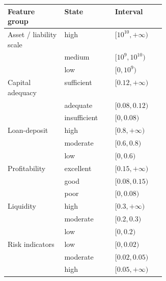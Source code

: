 \documentclass[lettersize,journal]{IEEEtran}
\begin{document}
\noindent\begin{minipage}{\linewidth}
\begin{center}
\label{tab:state-mapping}
\scriptsize
\setlength{\tabcolsep}{3.5pt}
\renewcommand{\arraystretch}{1.08}
\begin{tabular}{@{}>{\RaggedRight\arraybackslash}p{0.36\linewidth} l l@{}}
\hline
\textbf{Feature group} & \textbf{State} & \textbf{Interval} \\
\hline
Asset / liability scale & high & $[10^{10},+\infty)$ \\
 & medium & $[10^{9},10^{10})$ \\
 & low & $[0,10^{9})$ \\[1pt]
Capital adequacy & sufficient & $[0.12,+\infty)$ \\
 & adequate & $[0.08,0.12)$ \\
 & insufficient & $[0,0.08)$ \\[1pt]
Loan-deposit & high & $[0.8,+\infty)$ \\
 & moderate & $[0.6,0.8)$ \\
 & low & $[0,0.6)$ \\[1pt]
Profitability & excellent & $[0.15,+\infty)$ \\
 & good & $[0.08,0.15)$ \\
 & poor & $[0,0.08)$ \\[1pt]
Liquidity & high & $[0.3,+\infty)$ \\
 & moderate & $[0.2,0.3)$ \\
 & low & $[0,0.2)$ \\[1pt]
Risk indicators & low & $[0,0.02)$ \\
 & moderate & $[0.02,0.05)$ \\
 & high & $[0.05,+\infty)$ \\
\hline
\end{tabular}
\end{center}
\end{minipage}
\end{document}
